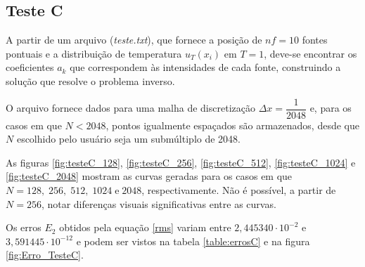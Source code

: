 \documentclass[12pt]{article}
\begin{document}
\begin{spacing}{1.5}
\subsection{Teste C}

A partir de um arquivo (\textit{teste.txt}), que fornece a posição de $n f=10$ fontes pontuais e a distribuição de temperatura $u_T(x_i)$ em $T=1$, deve-se encontrar os coeficientes $a_k$ que correspondem às intensidades de cada fonte, construindo a solução que resolve o problema inverso.

O arquivo fornece dados para uma malha de discretização $\Delta x = \dfrac{1}{2048}$ e, para os casos em que $N < 2048$, pontos igualmente espaçados são armazenados, desde que $N$ escolhido pelo usuário seja um submúltiplo de 2048.

As figuras \ref{fig:testeC_128}, \ref{fig:testeC_256}, \ref{fig:testeC_512}, \ref{fig:testeC_1024} e \ref{fig:testeC_2048} mostram as curvas geradas para os casos em que $N = 128,\;256,\;512,\;1024\;\text{e}\;2048$, respectivamente. Não é possível, a partir de $N=256$, notar diferenças visuais significativas entre as curvas.

Os erros $E_2$ obtidos pela equação \eqref{rms} variam entre $2,445340\cdot10^{-2}$ e $3,591445\cdot10^{-12}$ e podem ser vistos na tabela \ref{table:errosC} e na figura \ref{fig:Erro_TesteC}.


\end{spacing}
\end{document}
